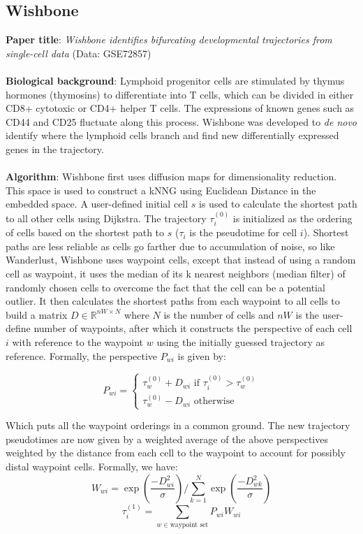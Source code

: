 \documentclass[11pt]{article}
\begin{document}
\subsection{Wishbone}
\textbf{Paper title}: \emph{Wishbone identifies bifurcating developmental
trajectories from single-cell data} (Data: GSE72857) \\
\\
\textbf{Biological background}: Lymphoid progenitor cells are stimulated by thymus hormones (thymosins) to differentiate into T cells, which can be divided in either CD8+ cytotoxic or CD4+ helper T cells. The expressions of known genes such as CD44 and CD25 fluctuate along this process. Wishbone was developed to \emph{de novo} identify where the lymphoid cells branch and find new differentially expressed genes in the trajectory.\\
\\
\textbf{Algorithm}: Wishbone first uses diffusion maps for dimensionality reduction. This space is used to construct a kNNG using Euclidean Distance in the embedded space. A user-defined initial cell $s$ is used to calculate the shortest path to all other cells using Dijkstra. The trajectory $\tau_{i}^{(0)}$ is initialized as the ordering of cells based on the shortest path to $s$ ($\tau_{i}$ is the pseudotime for cell $i$). Shortest paths are less reliable as cells go farther due to accumulation of noise, so like Wanderlust, Wishbone uses waypoint cells, except that instead of using a random cell as waypoint, it uses the median of its k nearest neighbors (median filter) of randomly chosen cells to overcome the fact that the cell can be a potential outlier. It then calculates the shortest paths from each waypoint to all cells to build a matrix $D \in \mathbb{R}^{nW \times N}$ where $N$ is the number of cells and $nW$ is the user-define number of waypoints, after which it constructs the perspective of each cell $i$ with reference to the waypoint $w$ using the initially guessed trajectory as reference. Formally, the perspective $P_{wi}$ is given by:

$$
P_{wi} = 
\begin{cases}
\tau_{w}^{(0)} + D_{wi}\mbox{ if }\tau_{i}^{(0)} > \tau_{w}^{(0)} \\
\tau_{w}^{(0)} - D_{wi}\mbox{ otherwise}
\end{cases}
$$

Which puts all the waypoint orderings in a common ground. The new trajectory pseudotimes are now given by a weighted average of the above perspectives weighted by the distance from each cell to the waypoint to account for possibly distal waypoint cells. Formally, we have:
$$
W_{wi} = \exp \left(\frac{-D_{wi}^{2}}{\sigma} \right)/\sum_{k=1}^{N} \exp \left( \frac{-D_{wk}^{2}}{\sigma}\right)
$$
$$
\tau_{i}^{(1)}  = \sum_{w \in \mbox{waypoint set}} P_{wi} W_{wi} 
$$
\end{document}
